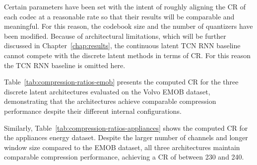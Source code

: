 Certain parameters have been set with the intent of roughly aligning the CR of each codec at a reasonable rate so that their results will be comparable and meaningful. For this reason, the codebook size and the number of quantizers have been modified. Because of architectural limitations, which will be further discussed in Chapter~\ref{chap:results}, the continuous latent TCN RNN baseline cannot compete with the discrete latent methods in terms of CR. For this reason the TCN RNN baseline is omitted here.

Table~\ref{tab:compression-ratios-emob} presents the computed CR for the three discrete latent architectures evaluated on the Volvo EMOB dataset, demonstrating that the architectures achieve comparable compression performance despite their different internal configurations.

\begin{table}[h]
\small
\centering
\caption{Compression Ratio Comparison for EMOB Dataset (3 channels, 128 timesteps)}
\label{tab:compression-ratios-emob}
\end{table}

Similarly, Table~\ref{tab:compression-ratios-appliances} shows the computed CR for the appliances energy dataset. Despite the larger number of channels and longer window size compared to the EMOB dataset, all three architectures maintain comparable compression performance, achieving a CR of between 230 and 240.

\begin{table}[h]
\centering
\caption{Compression Ratio Comparison for Appliances Energy Dataset (7 channels, 144 timesteps)}
\label{tab:compression-ratios-appliances}
\end{table}


